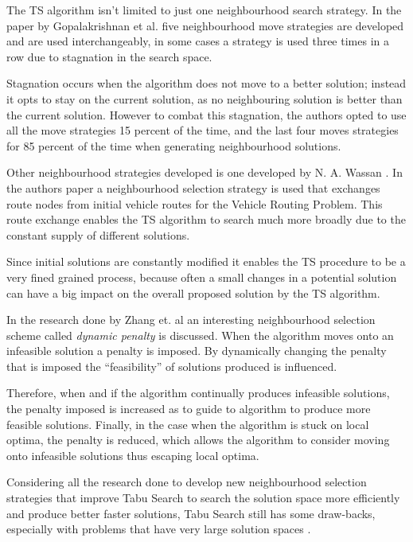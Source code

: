 The TS algorithm isn't limited to just one neighbourhood search strategy. In the paper by Gopalakrishnan et al.\cite{TabuCarryOver} five neighbourhood move strategies are developed and are used interchangeably, in some cases a strategy is used three times in a row due to stagnation in the search space. 

Stagnation occurs when the algorithm does not move to a better solution; instead it opts to stay on the current solution, as no neighbouring solution is better than the current solution. However to combat this stagnation, the authors opted to use all the move strategies 15 percent of the time, and the last four moves strategies for 85 percent of the time when generating neighbourhood solutions.

Other neighbourhood strategies developed is one developed by N. A. Wassan \cite{ReactiveTabuVHR}. In the authors paper a neighbourhood selection strategy is used that exchanges route nodes from initial vehicle routes for the Vehicle Routing Problem. This route exchange enables the TS algorithm to search much more broadly due to the constant supply of different solutions. 

Since initial solutions are constantly modified it enables the TS procedure to be a very fined grained process, because often a small changes in a potential solution can have a big impact on the overall proposed solution by the TS algorithm.

In the research done by Zhang et. al \cite{TSHazardous} an interesting neighbourhood selection scheme called \emph{dynamic penalty} is discussed. When the algorithm moves onto an infeasible solution a penalty is imposed. By dynamically changing the penalty that is imposed the ``feasibility'' of solutions produced is influenced. 

Therefore, when and if the algorithm continually produces infeasible solutions, the penalty imposed is increased as to guide to algorithm to produce more feasible solutions. Finally, in the case when the algorithm is stuck on local optima, the penalty is reduced, which allows the algorithm to consider moving onto infeasible solutions thus escaping local optima.

Considering all the research done to develop new neighbourhood selection strategies that improve Tabu Search to search the solution space more efficiently and produce better faster solutions, Tabu Search still has some draw-backs, especially with problems that have very large solution spaces \cite{EvoParallelTabu}.

